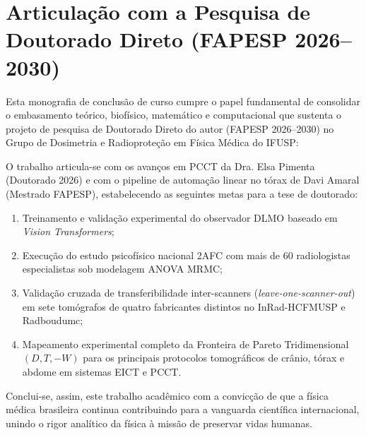 \section{Articulação com a Pesquisa de Doutorado Direto (FAPESP 2026--2030)}
\label{sec:fapesp_doutorado}

Esta monografia de conclusão de curso cumpre o papel fundamental de consolidar o embasamento teórico, biofísico, matemático e computacional que sustenta o projeto de pesquisa de Doutorado Direto do autor (FAPESP 2026--2030) no Grupo de Dosimetria e Radioproteção em Física Médica do IFUSP:

O trabalho articula-se com os avanços em PCCT da Dra. Elsa Pimenta (Doutorado 2026) \cite{pimenta2026} e com o pipeline de automação linear no tórax de Davi Amaral (Mestrado FAPESP), estabelecendo as seguintes metas para a tese de doutorado:
\begin{enumerate}[label=\alph*)]
  \item Treinamento e validação experimental do observador DLMO baseado em \emph{Vision Transformers};
  \item Execução do estudo psicofísico nacional 2AFC com mais de 60 radiologistas especialistas sob modelagem ANOVA MRMC;
  \item Validação cruzada de transferibilidade inter-scanners (\emph{leave-one-scanner-out}) em sete tomógrafos de quatro fabricantes distintos no InRad-HCFMUSP e Radboudumc;
  \item Mapeamento experimental completo da Fronteira de Pareto Tridimensional $(D, T, -W)$ para os principais protocolos tomográficos de crânio, tórax e abdome em sistemas EICT e PCCT.
\end{enumerate}

Conclui-se, assim, este trabalho acadêmico com a convicção de que a física médica brasileira continua contribuindo para a vanguarda científica internacional, unindo o rigor analítico da física à missão de preservar vidas humanas.
